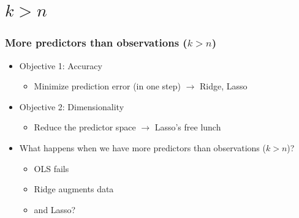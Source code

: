 \documentclass[
  shownotes,
  xcolor={svgnames},
  hyperref={colorlinks,citecolor=DarkBlue,linkcolor=andesred,urlcolor=DarkBlue}
  , aspectratio=169]{beamer}
\begin{document}
\section{$k>n$}
\begin{frame}[fragile]
\frametitle{More predictors than observations ($k>n$)}

\begin{itemize}
  \item Objective 1: Accuracy
  \begin{itemize}
    \item Minimize prediction error (in one step) $\rightarrow$ Ridge, Lasso
    \end{itemize}
    \bigskip
  \item Objective 2: Dimensionality
  \begin{itemize}
    \item Reduce the predictor space $\rightarrow$ Lasso's free lunch
    \end{itemize}
\end{itemize}
\bigskip
\bigskip
\begin{itemize}
  \item What happens when we have more predictors than observations ($k>n$)?
  \begin{itemize}
   \item OLS fails
   \medskip
   \item Ridge augments data
   \medskip
   \item and Lasso?
  \end{itemize}
\end{itemize}

\end{frame}
\end{document}
